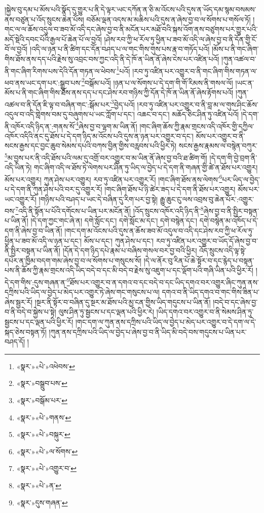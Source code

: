 །སྐྱེས་བུ་དམ་པ་མོས་པའི་སྣོད་དུ་གྱུར་པ་ནི་དེ་ལྟར་ཡང་དཀོན་ན་ཅི་མ་འོངས་པའི་དུས་ན་ཡོད་དམ་སྙམ་བསམས་ནས་བཙུན་པ་འོད་སྲུངས་ཆེན་པོས། བཅོམ་ལྡན་འདས་མ་མཆིས་པའི་དུས་ན་ཞེས་བྱ་བ་ལ་སོགས་པ་གསོལ་ཏོ། །གང་ལ་ལ་ཆོས་འདུལ་བ་ཟབ་མོ་འདི་དང་ཞེས་བྱ་བ་ནི་མངོན་པར་མཐོ་བའི་སྐས་འོག་ནས་བཙུགས་པར་གྱུར་པའི་མདོ་སྡེའི་དབང་པོའི་རྒྱལ་པོ་ཆེན་པོ་ལ་བྱའོ། །ཤེས་རབ་ཀྱི་ཕ་རོལ་ཏུ་ཕྱིན་པ་ཟབ་མོ་འདི་ལ་ཞེས་བྱ་བ་ནི་དོན་གྱི་ངོ་བོ་ལ་བྱའོ། །འདི་ལ་ཉན་པ་ནི་ཚིག་དང་དོན་བཤད་པ་ལ་གང་གིས་གུས་པས་རྣ་བ་གཏོད་པའོ། །མོས་པ་ནི་གང་ཞིག་གིས་ཐོས་ནས་དད་པའི་རྗེས་སུ་འབྲང་བས་ཀྱང་འདི་ནི་དེ་ཁོ་ན་ཡིན་ནོ་ཞེས་ངེས་པར་འཛིན་པའོ། །ཀུན་འཚལ་བ་ནི་གང་ཞིག་རིགས་པས་དེའི་དོན་གཏན་ལ་ཕེབས་\footnote{«སྣར་»«པེ་»འཕེབས་}པའོ། །རབ་ཏུ་འཛིན་པར་འགྱུར་བ་ནི་གང་ཞིག་གིས་གཏན་ལ་ཕབ་ནས་ཡང་དག་པར་:སྒྲུབ་པས་\footnote{«སྣར་»བསྒྲུབ་པས་}བསྒོམ་པའོ། །ཉན་པ་ལ་སོགས་པ་དེ་དག་གི་གོ་རིམས་ནི་གསལ་ལོ། །ཡང་ན་མོས་པ་ནི་གང་ཞིག་གིས་ཐོས་ནས་དད་པ་དང་ཤེས་རབ་གཉིས་ཀྱི་དོན་དེ་ཁོ་ན་ཡིན་ནོ་ཞེས་རྟོགས་པའོ། །ཀུན་འཚལ་བ་ནི་དོན་ཇི་ལྟ་བ་བཞིན་གང་:སྒོམ་པར་\footnote{«སྣར་»བསྒོམ་པར་}བྱེད་པའོ། །རབ་ཏུ་འཛིན་པར་འགྱུར་བ་ནི་བླ་མ་ལ་གུས་ཤིང་ཆོས་འདུལ་བ་འདི་གླེགས་བམ་དུ་བཞུགས་པ་ཡང་ཀློག་པ་དང་། འཆང་བ་དང་། མཆོད་ཅིང་ཤིན་ཏུ་འཛིན་པའོ། །དེ་དག་ནི་འཁོར་འདི་ཉིད་ན་:གནས་སོ་\footnote{«སྣར་»«པེ་»གནས་}ཞེས་བྱ་བ་ལྷག་མ་ཡིན་ནོ། །གང་ཞིག་ཆོས་ཀྱི་རྣམ་གྲངས་འདི་འཁོར་གྱི་དཀྱིལ་འཁོར་འདིའི་ནང་དུ་ཐོས་པ་དེ་དག་ཉིད་མ་འོངས་པའི་དུས་ན་ཉན་པར་འགྱུར་བ་དང་། མོས་པར་འགྱུར་བ་ནི་སངས་རྒྱས་དང་བྱང་ཆུབ་སེམས་དཔའི་བཀས་བྱིན་གྱིས་བརླབས་པའི་ཕྱིར་ཏེ། སངས་རྒྱས་རྣམས་ལ་བསྙེན་བཀུར་\footnote{«སྣར་»«པེ་»བསྐུར་}མ་བྱས་པར་ནི་འདི་ཐོས་པའི་ལམ་དུ་འགྲོ་བར་འགྱུར་བ་མ་ཡིན་ནོ་ཞེས་བྱ་བའི་ཐ་ཚིག་གོ། །དེ་དག་གི་བྱེ་བྲག་ནི་འདི་ཡིན་ཏེ། གང་ཞིག་འདི་ལ་ཐོས་ཏེ་ལེགས་པར་ཤིན་ཏུ་ཡིད་ལ་བྱེད་པ་དེ་དག་ནི་གཞན་གྱི་ཚེ་ན་ཐོས་པར་འགྱུར། མོས་པར་འགྱུར། ཀུན་ཤེས་པར་འགྱུར། རབ་ཏུ་འཛིན་པར་འགྱུར་རོ། །གང་ཞིག་ཐོས་ནས་ལེགས་\footnote{«སྣར་»«པེ་»ལ་སོགས་}པར་ཡིད་ལ་བྱེད་པ་དེ་དག་ནི་ཀུན་ཤེས་པའི་བར་དུ་འགྱུར་རོ། །གང་ཞིག་ཐོས་པ་ཉི་ཚེར་ཟད་པ་དེ་དག་ནི་ཐོས་པར་འགྱུར། མོས་པར་ཡང་འགྱུར་རོ། །གཉིས་པའི་བཤད་པ་ཡང་དེ་བཞིན་དུ་རིག་པར་བྱ་སྟེ། རྒྱུ་ཆུང་ངུ་ལས་འབྲས་བུ་ཆེན་པོར་:འགྱུར་བས་\footnote{«སྣར་»«པེ་»འགྱུར་བ་}འདི་ནི་སྟོན་པ་པོའི་དགོངས་པ་ཡིན་པར་མངོན་ནོ། །འོད་སྲུངས་འཁོར་འདི་ཉིད་ནི་\footnote{«སྣར་»«པེ་»ན་}ཞེས་བྱ་བ་ནི་སྤྱིར་བསྟན་པ་ཡིན་ནོ། །དེ་དག་ཀྱང་གང་ཞེ་ན། དགེ་སློང་དང་། དགེ་སློང་མ་དང་། དགེ་བསྙེན་དང་། དགེ་བསྙེན་མ་འཁོད་པ་དེ་དག་ནི་ཞེས་བྱ་བ་ཡིན་ནོ། །གང་དག་མ་འོངས་པའི་དུས་ན་ཆོས་ཟབ་མོ་འདུལ་བ་འདི་དང་ཤེས་རབ་ཀྱི་ཕ་རོལ་ཏུ་ཕྱིན་པ་ཟབ་མོ་འདི་ལ་ཉན་པ་དང་། མོས་པ་དང་། ཀུན་ཤེས་པ་དང་། རབ་ཏུ་འཛིན་པར་འགྱུར་བ་ཡོད་དོ་ཞེས་བྱ་བ་ནི་སྤྱིར་བསྟན་པ་ཡིན་ནོ། །དོན་དེ་དག་ཉིད་དཔེ་རྣམ་པ་བཞིས་གསལ་བར་བྱ་བའི་ཕྱིར། འོད་སྲུངས་འདི་ལྟ་སྟེ་དཔེར་ན་ཁྱིམ་བདག་གམ་ཞེས་བྱ་བ་ལ་སོགས་པ་གསུངས་སོ། །དེ་ལ་ནོར་བུ་རིན་པོ་ཆེ་སྟོར་བ་དང་རྙེད་པ་བསྟན་པས་ནི་ཆོས་ཀྱི་རྣམ་གྲངས་འདི་ཡིད་བདེ་བ་དང་མི་བདེ་བ་རྗེས་སུ་འཇུག་པ་དང་ལྡོག་པའི་གཞི་ཡིན་པའི་ཕྱིར་རོ། །དེ་དག་གིས་:དུས་གཞན་ན་\footnote{«སྣར་»དུས་གཞན་}ཐོས་པར་འགྱུར་བ་ན་དགའ་བ་དང་བདེ་བ་དང་ཡིད་དགའ་བར་འགྱུར་ཞིང་ཀུན་ནས་དཀྲིས་པའི་ཡིད་ལ་བྱེད་པ་མེད་པར་འགྱུར་ཏེ་ཞེས་གང་གསུངས་པ་ལ། དགའ་བ་ནི་ཡིད་དགའ་བ་གང་གིས་ཟིན་པ་ཞེས་སྦྱར་རོ། །སྔར་ནི་སྟོར་བ་བཞིན་དུ་སྔར་མ་ཐོས་པའི་མྱ་ངན་གྱིས་ཡིད་གདུངས་པ་ཡིན་ནོ། །བདེ་བ་དང་ཞེས་བྱ་བ་ནི་བདེ་བ་སྐྱེས་པ་སྟེ། ལུས་ཤིན་ཏུ་སྦྱངས་པ་དང་ལྡན་པའི་ཕྱིར་རེ། །ཡིད་དགའ་བར་འགྱུར་བ་ནི་སེམས་ཤིན་ཏུ་སྦྱངས་པ་དང་ལྡན་པའི་ཕྱིར་རོ། །གང་དག་ལ་ཀུན་ནས་དཀྲིས་པའི་ཡིད་ལ་བྱེད་པ་མེད་པར་འགྱུར་བ་དེ་དག་ལ་དེ་སྐད་ཅེས་བསྟན་ཏོ། །ཀུན་ནས་དཀྲིས་པའི་ཡིད་ལ་བྱེད་པ་ཞེས་བྱ་བ་ནི་ཡིད་མི་བདེ་བས་གདུངས་པ་ཡིན་པར་བཤད་དོ། །
